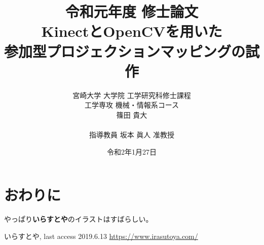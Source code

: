 \documentclass[a4paper,12pt,onecolumn,oneside,openany]{jsbook}
\title{
{\Large 令和元年度 修士論文} \\[4cm]
\LARGE KinectとOpenCVを用いた
     \\参加型プロジェクションマッピングの試作 \\[4cm]
}
\author{宮崎大学 大学院 工学研究科修士課程\\
工学専攻 機械・情報系コース\\
篠田 貴大\\
\\
指導教員 坂本 眞人 准教授
}
\date{令和2年1月27日}
\begin{document}
\maketitle

\clearpage

\renewcommand{\thepage}{\roman{page}}


{\makeatletter
\let\ps@jpl@in\ps@empty
\makeatother
\pagestyle{plain}

\tableofcontents
\listoffigures
\listoftables
\pagestyle{fancy}
\clearpage}








\section{おわりに}
やっぱり{\bf いらすとや}のイラストはすばらしい。

\begin{thebibliography}{99}
     いらすとや, last access 2019.6.13 \url{https://www.irasutoya.com/}



\end{thebibliography}
\end{document}
